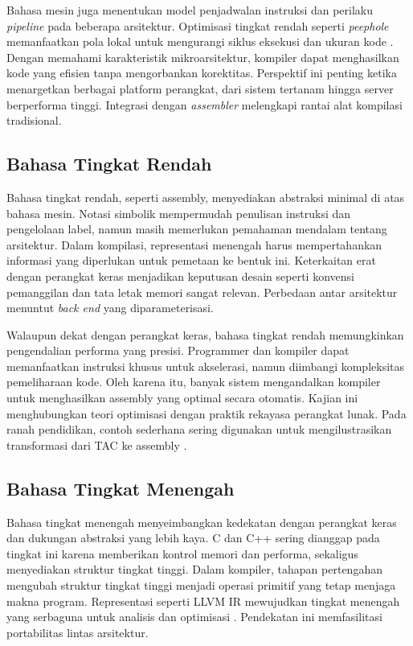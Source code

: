 \documentclass[../main.tex]{subfiles}
\begin{document}
Bahasa mesin juga menentukan model penjadwalan instruksi dan perilaku \emph{pipeline} pada beberapa arsitektur. Optimisasi tingkat rendah seperti \emph{peephole} memanfaatkan pola lokal untuk mengurangi siklus eksekusi dan ukuran kode \citep{WikiPeephole}. Dengan memahami karakteristik mikroarsitektur, kompiler dapat menghasilkan kode yang efisien tanpa mengorbankan korektitas. Perspektif ini penting ketika menargetkan berbagai platform perangkat, dari sistem tertanam hingga server berperforma tinggi. Integrasi dengan \emph{assembler} melengkapi rantai alat kompilasi tradisional.

\subsection{Bahasa Tingkat Rendah}
Bahasa tingkat rendah, seperti assembly, menyediakan abstraksi minimal di atas bahasa mesin. Notasi simbolik mempermudah penulisan instruksi dan pengelolaan label, namun masih memerlukan pemahaman mendalam tentang arsitektur. Dalam kompilasi, representasi menengah harus mempertahankan informasi yang diperlukan untuk pemetaan ke bentuk ini. Keterkaitan erat dengan perangkat keras menjadikan keputusan desain seperti konvensi pemanggilan dan tata letak memori sangat relevan. Perbedaan antar arsitektur menuntut \emph{back end} yang diparameterisasi.

Walaupun dekat dengan perangkat keras, bahasa tingkat rendah memungkinkan pengendalian performa yang presisi. Programmer dan kompiler dapat memanfaatkan instruksi khusus untuk akselerasi, namun diimbangi kompleksitas pemeliharaan kode. Oleh karena itu, banyak sistem mengandalkan kompiler untuk menghasilkan assembly yang optimal secara otomatis. Kajian ini menghubungkan teori optimisasi dengan praktik rekayasa perangkat lunak. Pada ranah pendidikan, contoh sederhana sering digunakan untuk mengilustrasikan transformasi dari TAC ke assembly \citep{WikiTAC}.

\subsection{Bahasa Tingkat Menengah}
Bahasa tingkat menengah menyeimbangkan kedekatan dengan perangkat keras dan dukungan abstraksi yang lebih kaya. C dan C++ sering dianggap pada tingkat ini karena memberikan kontrol memori dan performa, sekaligus menyediakan struktur tingkat tinggi. Dalam kompiler, tahapan pertengahan mengubah struktur tingkat tinggi menjadi operasi primitif yang tetap menjaga makna program. Representasi seperti LLVM IR mewujudkan tingkat menengah yang serbaguna untuk analisis dan optimisasi \citep{LLVMOverview}. Pendekatan ini memfasilitasi portabilitas lintas arsitektur.
\end{document}
